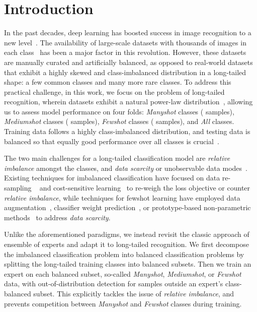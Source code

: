 \documentclass[runningheads]{llncs}
\begin{document}
\section{Introduction}
In the past decades, deep learning has boosted success in image recognition to a new level~\cite{he2016deep}. The availability of large-scale datasets with thousands of images in each class~\cite{deng2009imagenet,zhou2017places} has been a major factor in this revolution. However, these datasets are manually curated and artificially balanced, as opposed to real-world datasets that exhibit a highly skewed and class-imbalanced distribution in a long-tailed shape: a few common classes and many more rare classes. To address this practical challenge, in this work, we focus on the problem of long-tailed recognition, wherein datasets exhibit a natural power-law distribution~\cite{van2017devil}, allowing us to assess model performance on four folds: \emph{Manyshot} classes ( samples), \emph{Mediumshot} classes ( samples), \emph{Fewshot} classes ( samples), and \emph{All} classes. Training data follows a highly class-imbalanced distribution, and testing data is balanced so that equally good performance over all classes is crucial~\cite{liu2019large}.

The two main challenges for a long-tailed classification model are \emph{relative imbalance} amongst the classes, and \emph{data scarcity} or unobservable data modes~\cite{he2009learning}. Existing techniques for imbalanced classification have focused on data re-sampling ~\cite{estabrooks2004multiple,he2009learning} and cost-sensitive learning~\cite{lin2017focal,cui2019class} to re-weigh the loss objective or counter \emph{relative imbalance}, while techniques for fewshot learning have employed data augmentation~\cite{felix2018multi,wang2018low,xian2018feature,xian2019f}, classifier weight prediction~\cite{gidaris2018dynamic,qiao2018few,qi2018low}, or prototype-based non-parametric methods~\cite{snell2017prototypical,vinyals2016matching,liu2019large} to address \emph{data scarcity}. 

Unlike the aforementioned paradigms, we instead revisit the classic approach of ensemble of experts \cite{jacobs1991adaptive,yuksel2012twenty,hinton2015distilling} and adapt it to long-tailed recognition. We first decompose the imbalanced classification problem into balanced classification problems by splitting the long-tailed training classes into balanced subsets. Then we train an expert on each balanced subset, so-called \emph{Manyshot}, \emph{Mediumshot}, or \emph{Fewshot} data, with out-of-distribution detection for samples outside an expert's class-balanced subset. This explicitly tackles the issue of \emph{relative imbalance}, and prevents competition between \emph{Manyshot} and \emph{Fewshot} classes during training. 
\end{document}
